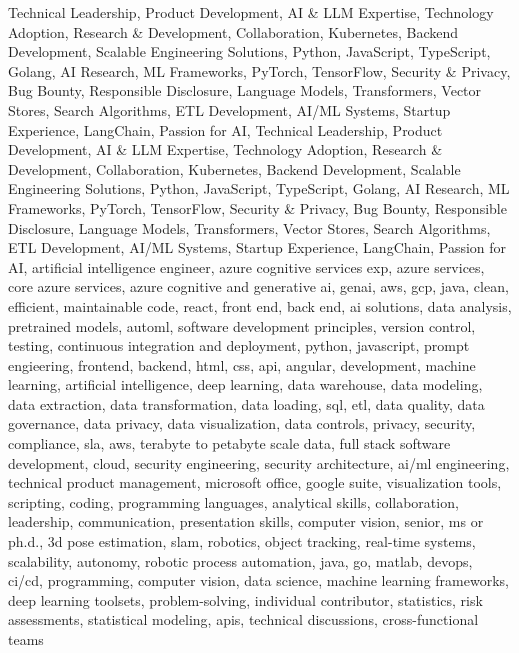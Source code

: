 \documentclass{resume} %
\begin{document}
Technical Leadership, Product Development, AI \& LLM Expertise, Technology Adoption, Research \& Development, Collaboration, Kubernetes, Backend Development, Scalable Engineering Solutions, Python, JavaScript, TypeScript, Golang, AI Research, ML Frameworks, PyTorch, TensorFlow, Security \& Privacy, Bug Bounty, Responsible Disclosure, Language Models, Transformers, Vector Stores, Search Algorithms, ETL Development, AI/ML Systems, Startup Experience, LangChain, Passion for AI, Technical Leadership, Product Development, AI \& LLM Expertise, Technology Adoption, Research \& Development, Collaboration, Kubernetes, Backend Development, Scalable Engineering Solutions, Python, JavaScript, TypeScript, Golang, AI Research, ML Frameworks, PyTorch, TensorFlow, Security \& Privacy, Bug Bounty, Responsible Disclosure, Language Models, Transformers, Vector Stores, Search Algorithms, ETL Development, AI/ML Systems, Startup Experience, LangChain, Passion for AI, {artificial intelligence engineer, azure cognitive services exp, azure services, core azure services, azure cognitive and generative ai, genai, aws,  gcp, java, clean, efficient, maintainable code, react, front end, back end, ai solutions, data analysis, pretrained models, automl, software development principles, version control, testing, continuous integration and deployment, python, javascript, prompt engieering, frontend, backend, html, css, api, angular, development, machine learning, artificial intelligence, deep learning, data warehouse, data modeling, data extraction, data transformation, data loading, sql, etl, data quality, data governance, data privacy, data visualization, data controls, privacy, security, compliance, sla, aws, terabyte to petabyte scale data, full stack software development, cloud, security engineering, security architecture, ai/ml engineering, technical product management, microsoft office, google suite, visualization tools, scripting, coding, programming languages, analytical skills, collaboration, leadership, communication, presentation skills, computer vision, senior, ms or ph.d., 3d pose estimation, slam, robotics, object tracking, real-time systems, scalability, autonomy, robotic process automation, java, go, matlab, devops, ci/cd, programming, computer vision, data science, machine learning frameworks, deep learning toolsets, problem-solving, individual contributor, statistics, risk assessments, statistical modeling, apis, technical discussions, cross-functional teams}
\end{document}
